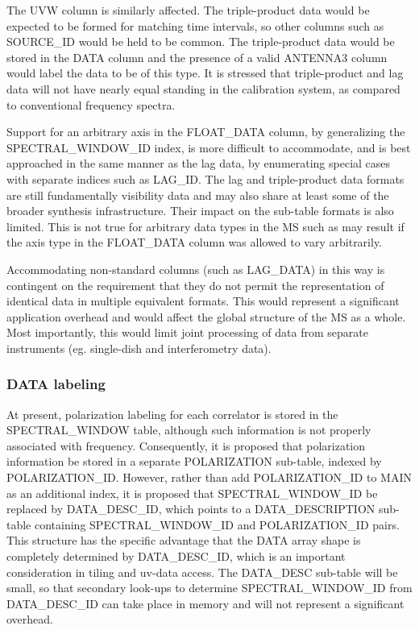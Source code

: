 \documentclass{article}
\begin{document}
The UVW column is similarly affected. The triple-product data would
be expected to be formed for matching time intervals, so other columns
such as SOURCE\_ID would be held to be common. The triple-product data
would be stored in the DATA column and the presence of a valid
ANTENNA3 column would label the data to be of this type. It is
stressed that triple-product and lag data will not have nearly equal
standing in the calibration system, as compared to conventional
frequency spectra.

Support for an arbitrary axis in the FLOAT\_DATA column, by
generalizing the SPECTRAL\_WINDOW\_ID index, is more difficult to
accommodate, and is best approached in the same manner as the lag
data, by enumerating special cases with separate indices such as
LAG\_ID. The lag and triple-product data formats are still
fundamentally visibility data and may also share at least some of the
broader synthesis infrastructure. Their impact on the sub-table
formats is also limited. This is not true for arbitrary data types in
the MS such as may result if the axis type in the FLOAT\_DATA
column was allowed to vary arbitrarily. 

 Accommodating non-standard columns (such as LAG\_DATA) in this way is
contingent on the requirement that they do not permit the
representation of identical data in multiple equivalent formats. This
would represent a significant application overhead and would affect
the global structure of the MS as a whole. Most importantly, this
would limit joint processing of data from separate instruments
(eg. single-dish and interferometry data).


\subsubsection{DATA labeling}

At present, polarization labeling for each correlator is stored in the
SPECTRAL\_WINDOW table, although such information is not properly
associated with frequency. Consequently, it is proposed that
polarization information be stored in a separate POLARIZATION
sub-table, indexed by POLARIZATION\_ID. However, rather than add
POLARIZATION\_ID to MAIN as an additional index, it is proposed that
SPECTRAL\_WINDOW\_ID be replaced by DATA\_DESC\_ID, which points to a
DATA\_DESCRIPTION sub-table containing SPECTRAL\_WINDOW\_ID and
POLARIZATION\_ID pairs. This structure has the specific advantage that
the DATA array shape is completely determined by DATA\_DESC\_ID, which
is an important consideration in tiling and uv-data access. The
DATA\_DESC sub-table will be small, so that secondary look-ups to
determine SPECTRAL\_WINDOW\_ID from DATA\_DESC\_ID can take place in
memory and will not represent a significant overhead.
\end{document}
